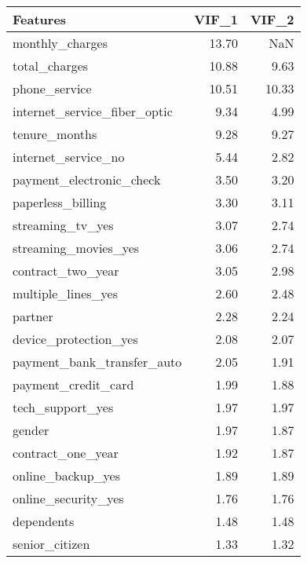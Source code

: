 \begin{tabular}{lrr}
\toprule
                    Features &  VIF\_1 &  VIF\_2 \\
\midrule
             monthly\_charges &  13.70 &    NaN \\
               total\_charges &  10.88 &   9.63 \\
               phone\_service &  10.51 &  10.33 \\
internet\_service\_fiber\_optic &   9.34 &   4.99 \\
               tenure\_months &   9.28 &   9.27 \\
         internet\_service\_no &   5.44 &   2.82 \\
    payment\_electronic\_check &   3.50 &   3.20 \\
           paperless\_billing &   3.30 &   3.11 \\
            streaming\_tv\_yes &   3.07 &   2.74 \\
        streaming\_movies\_yes &   3.06 &   2.74 \\
           contract\_two\_year &   3.05 &   2.98 \\
          multiple\_lines\_yes &   2.60 &   2.48 \\
                     partner &   2.28 &   2.24 \\
       device\_protection\_yes &   2.08 &   2.07 \\
  payment\_bank\_transfer\_auto &   2.05 &   1.91 \\
         payment\_credit\_card &   1.99 &   1.88 \\
            tech\_support\_yes &   1.97 &   1.97 \\
                      gender &   1.97 &   1.87 \\
           contract\_one\_year &   1.92 &   1.87 \\
           online\_backup\_yes &   1.89 &   1.89 \\
         online\_security\_yes &   1.76 &   1.76 \\
                  dependents &   1.48 &   1.48 \\
              senior\_citizen &   1.33 &   1.32 \\
\bottomrule
\end{tabular}
